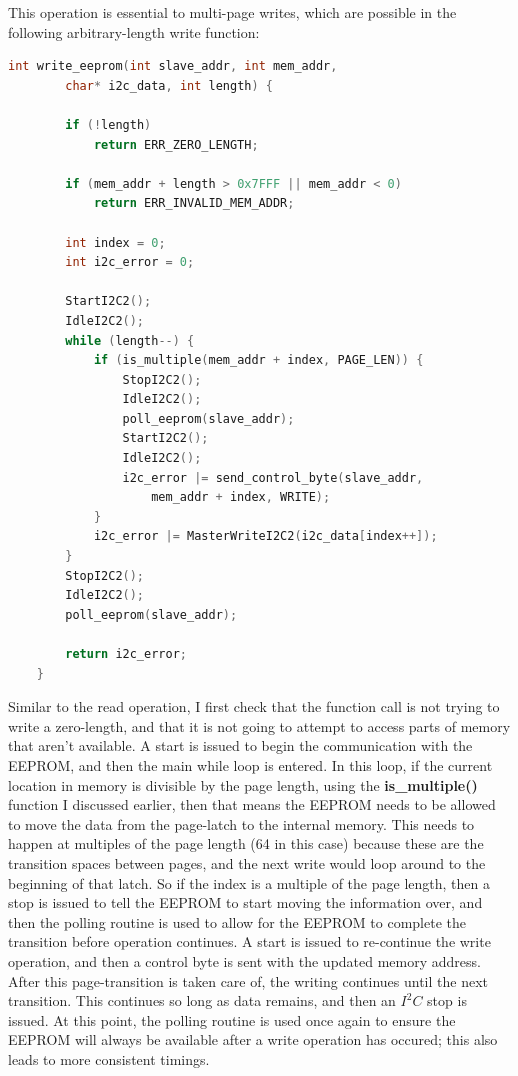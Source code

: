 \documentclass[a4paper, 12pt]{article}
\begin{document}
This operation is essential to multi-page writes, which are possible in the following arbitrary-length write function:

	\begin{mdframed}[backgroundcolor=code-gray, roundcorner=10pt,
								innerleftmargin=5, innertopmargin=5, innerbottommargin=5]	
	\begin{lstlisting}[language=C, caption=Arbitrary EEPROM Write, tabsize=2]
	int write_eeprom(int slave_addr, int mem_addr,
		char* i2c_data, int length) {
		
		if (!length)
			return ERR_ZERO_LENGTH;

		if (mem_addr + length > 0x7FFF || mem_addr < 0)
			return ERR_INVALID_MEM_ADDR;

		int index = 0;
		int i2c_error = 0;

		StartI2C2();
		IdleI2C2();
		while (length--) {
			if (is_multiple(mem_addr + index, PAGE_LEN)) {
				StopI2C2();
				IdleI2C2();
				poll_eeprom(slave_addr);
				StartI2C2();
				IdleI2C2();
				i2c_error |= send_control_byte(slave_addr,
					mem_addr + index, WRITE);
			}
			i2c_error |= MasterWriteI2C2(i2c_data[index++]);
		}
		StopI2C2();
		IdleI2C2();
		poll_eeprom(slave_addr);
	
		return i2c_error;
	}
	\end{lstlisting}
	\end{mdframed}
	
Similar to the read operation, I first check that the function call is not trying to write a zero-length, and that it is not going to attempt to access parts of memory that aren't available. A start is issued to begin the communication with the EEPROM, and then the main while loop is entered. In this loop, if the current location in memory is divisible by the page length, using the \textbf{is\_multiple()} function I discussed earlier, then that means the EEPROM needs to be allowed to move the data from the page-latch to the internal memory. This needs to happen at multiples of the page length (64 in this case) because these are the transition spaces between pages, and the next write would loop around to the beginning of that latch. So if the index is a multiple of the page length, then a stop is issued to tell the EEPROM to start moving the information over, and then the polling routine is used to allow for the EEPROM to complete the transition before operation continues. A start is issued to re-continue the write operation, and then a control byte is sent with the updated memory address. After this page-transition is taken care of, the writing continues until the next transition. This continues so long as data remains, and then an $I^2C$ stop is issued. At this point, the polling routine is used once again to ensure the EEPROM will always be available after a write operation has occured; this also leads to more consistent timings.
\end{document}
